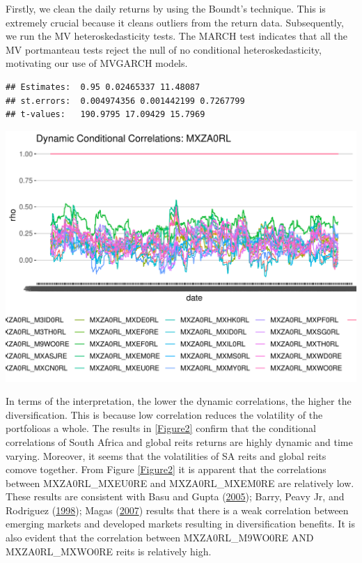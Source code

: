 \documentclass[11pt,preprint, authoryear]{elsarticle}
\let\origfigure\figure
\let\endorigfigure\endfigure
\renewenvironment{figure}[1][2] {
    \expandafter\origfigure\expandafter[H]
} {
    \endorigfigure
}
\numberwithin{equation}{section}
\numberwithin{figure}{section}
\numberwithin{table}{section}
\begin{document}
Firstly, we clean the daily returns by using the Boundt's technique.
This is extremely crucial because it cleans outliers from the return
data. Subsequently, we run the MV heteroskedasticity tests. The MARCH
test indicates that all the MV portmanteau tests reject the null of no
conditional heteroskedasticity, motivating our use of MVGARCH models.

\begin{verbatim}
## Estimates:  0.95 0.02465337 11.48087 
## st.errors:  0.004974356 0.001442199 0.7267799 
## t-values:   190.9795 17.09429 15.7969
\end{verbatim}

\begin{figure}[H]

{\centering \includegraphics{Template_files/figure-latex/DCC.plot-1} 

}

\caption{Dynamic Conditional Correlations for Each Asset Relative to the SA Reits \label{Figure2}}\label{fig:DCC.plot}
\end{figure}

In terms of the interpretation, the lower the dynamic correlations, the
higher the diversification. This is because low correlation reduces the
volatility of the portfolioas a whole. The results in \ref{Figure2}
confirm that the conditional correlations of South Africa and global
reits returns are highly dynamic and time varying. Moreover, it seems
that the volatilities of SA reits and global reits comove together. From
Figure \ref{Figure2} it is apparent that the correlations between
MXZA0RL\_MXEU0RE and MXZA0RL\_MXEM0RE are relatively low. These results
are consistent with Basu and Gupta
(\protect\hyperlink{ref-basu2005benefits}{2005}); Barry, Peavy Jr, and
Rodriguez (\protect\hyperlink{ref-barry1998performance}{1998}); Magas
(\protect\hyperlink{ref-magas2007changing}{2007}) results that there is
a weak correlation between emerging markets and developed markets
resulting in diversification benefits. It is also evident that the
correlation between MXZA0RL\_M9WO0RE AND MXZA0RL\_MXWO0RE reits is
relatively high.
\end{document}
